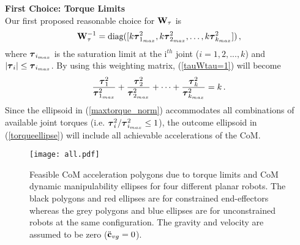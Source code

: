 \textbf{First Choice: Torque Limits}\\
\label{subsec:1stchoice}
Our first proposed reasonable choice for $\mathbf{W}_\tau$ is
%
\begin{equation}
\mathbf{W}_\tau^{-1} = \textrm{diag} ([k \boldsymbol{\tau}_{1_{max}}^2, k \boldsymbol{\tau}_{2_{max}}^2,
\ldots, k \boldsymbol{\tau}_{k_{max}}^2]) \, ,
\label{W_tau}
\end{equation}
%
where $\boldsymbol{\tau}_{i_{max}}$ is the saturation limit at the i$^{th}$ joint ($i = 1,
2, ..., k$) and $|\boldsymbol{\tau}_i| \leq \boldsymbol{\tau}_{i_{max}}$.  By using this weighting
matrix, (\ref{tauWtau=1}) will become
%
\begin{equation}
\frac{\boldsymbol{\tau}_1^2}{\boldsymbol{\tau}_{1_{max}}^2} + \frac{\boldsymbol{\tau}_2^2}{\boldsymbol{\tau}_{2_{max}}^2} +
\cdots + \frac{\boldsymbol{\tau}_k^2}{\boldsymbol{\tau}_{k_{max}}^2} = k \, .
\label{maxtorque_norm}
\end{equation}
%
Since the ellipsoid in (\ref{maxtorque_norm}) accommodates all combinations of
available joint torques (i.e.  $\boldsymbol{\tau}_i^2 / \boldsymbol{\tau}_{i_{max}}^2\leq 1$), the
outcome ellipsoid in (\ref{torqueellipse}) will include all achievable
accelerations of the CoM.
%
\begin{figure}
	\centering \texttt{[image: all.pdf]}
	\caption{Feasible CoM acceleration polygons due to torque limits and CoM
		dynamic manipulability ellipses for four different planar robots.  The
		black polygons and red ellipses are for constrained end-effectors whereas
		the grey polygons and blue ellipses are for unconstrained robots at the
		same configuration.  The gravity and velocity are assumed to be zero
		($\ddot{\mathbf{c}}_{vg}=0$).}
	\label{torque_ellipses}
\end{figure}
%

